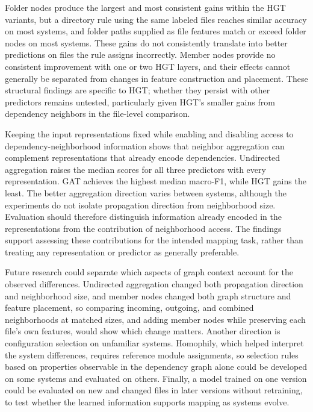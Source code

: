 Folder nodes produce the largest and most consistent gains within the HGT variants, but a directory rule using the same labeled files reaches similar accuracy on most systems, and folder paths supplied as file features match or exceed folder nodes on most systems. These gains do not consistently translate into better predictions on files the rule assigns incorrectly. Member nodes provide no consistent improvement with one or two HGT layers, and their effects cannot generally be separated from changes in feature construction and placement. These structural findings are specific to HGT; whether they persist with other predictors remains untested, particularly given HGT's smaller gains from dependency neighbors in the file-level comparison.

Keeping the input representations fixed while enabling and disabling access to dependency-neighborhood information shows that neighbor aggregation can complement representations that already encode dependencies. Undirected aggregation raises the median scores for all three predictors with every representation. GAT achieves the highest median macro-F1, while HGT gains the least. The better aggregation direction varies between systems, although the experiments do not isolate propagation direction from neighborhood size. Evaluation should therefore distinguish information already encoded in the representations from the contribution of neighborhood access. The findings support assessing these contributions for the intended mapping task, rather than treating any representation or predictor as generally preferable.

 Future research could separate which aspects of graph context account for the observed differences. Undirected aggregation changed both propagation direction and neighborhood size, and member nodes changed both graph structure and feature placement, so comparing incoming, outgoing, and combined neighborhoods at matched sizes, and adding member nodes while preserving each file's own features, would show which change matters. Another direction is configuration selection on unfamiliar systems. Homophily, which helped interpret the system differences, requires reference module assignments, so selection rules based on properties observable in the dependency graph alone could be developed on some systems and evaluated on others. Finally, a model trained on one version could be evaluated on new and changed files in later versions without retraining, to test whether the learned information supports mapping as systems evolve.